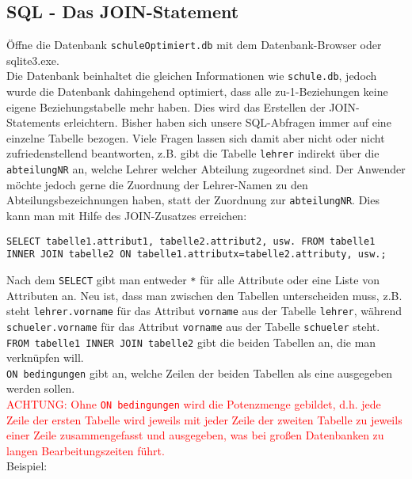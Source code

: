 \subsection[JOIN-Statement]{SQL - Das JOIN-Statement}\label{join}
Öffne die Datenbank \texttt{schuleOptimiert.db} mit dem Datenbank-Browser oder sqlite3.exe.\\
Die Datenbank beinhaltet die gleichen Informationen wie \texttt{schule.db}, jedoch wurde die Datenbank dahingehend optimiert, dass alle zu-1-Beziehungen keine eigene Beziehungstabelle mehr haben. Dies wird das Erstellen der JOIN-Statements erleichtern.
Bisher haben sich unsere SQL-Abfragen immer auf eine einzelne Tabelle bezogen. Viele Fragen lassen sich damit aber nicht oder nicht zufriedenstellend beantworten, z.B. gibt die Tabelle \lstinline!lehrer! indirekt über die \lstinline!abteilungNR! an, welche Lehrer welcher Abteilung zugeordnet sind. Der Anwender möchte jedoch gerne die Zuordnung der Lehrer-Namen zu den Abteilungsbezeichnungen haben, statt der Zuordnung zur \lstinline!abteilungNR!. Dies kann man mit Hilfe des JOIN-Zusatzes erreichen:
\begin{tcolorbox}[title=JOIN-Statement]
	\lstinline!SELECT tabelle1.attribut1, tabelle2.attribut2, usw. FROM tabelle1!\\
	\lstinline!INNER JOIN tabelle2 ON tabelle1.attributx=tabelle2.attributy, usw.;!
\end{tcolorbox}
Nach dem \lstinline!SELECT! gibt man entweder \lstinline!*! für alle Attribute oder  eine Liste von Attributen an. Neu ist, dass man zwischen den Tabellen unterscheiden muss, z.B. steht \lstinline!lehrer.vorname! für das Attribut \lstinline!vorname! aus der Tabelle \lstinline!lehrer!, während \lstinline!schueler.vorname! für das Attribut \lstinline!vorname! aus der Tabelle \lstinline!schueler! steht.\\
\lstinline!FROM tabelle1 INNER JOIN tabelle2! gibt die beiden Tabellen an, die man verknüpfen will.\\
\lstinline!ON bedingungen! gibt an, welche Zeilen der beiden Tabellen als eine ausgegeben werden sollen.\\
\textcolor{red}{ACHTUNG: Ohne \lstinline!ON bedingungen! wird die Potenzmenge gebildet, d.h. jede Zeile der ersten Tabelle wird jeweils mit jeder Zeile der zweiten Tabelle zu jeweils einer Zeile zusammengefasst und ausgegeben, was bei großen Datenbanken zu langen Bearbeitungszeiten führt.}\\
Beispiel:\\
